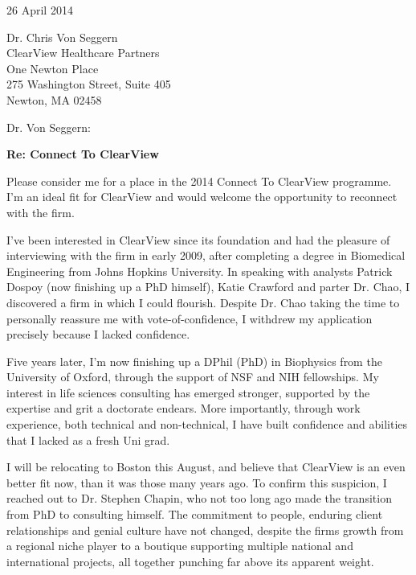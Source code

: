 \documentclass{../res}
\begin{document}
 
\begin{sloppypar}
 
%


\begin{resume} 
 
26 April 2014

Dr. Chris Von Seggern \\
ClearView Healthcare Partners \\
One Newton Place \\
275 Washington Street, Suite 405 \\
Newton, MA 02458

Dr. Von Seggern:

\textbf{Re: Connect To ClearView}

Please consider me for a place in the 2014 Connect To ClearView programme. I'm an ideal fit for ClearView and would welcome the opportunity to reconnect with the firm.

I've been interested in ClearView since its foundation and had the pleasure of interviewing with the firm in early 2009, after completing a degree in Biomedical Engineering from Johns Hopkins University. In speaking with analysts Patrick Dospoy (now finishing up a PhD himself), Katie Crawford and parter Dr. Chao, I discovered a firm in which I could flourish. Despite Dr. Chao taking the time to personally reassure me with vote-of-confidence, I withdrew my application precisely because I lacked confidence.

Five years later, I'm now finishing up a DPhil (PhD) in Biophysics from the University of Oxford, through the support of NSF and NIH fellowships. My interest in life sciences consulting has emerged stronger, supported by the expertise and grit a doctorate endears. More importantly, through work experience, both technical and non-technical, I have built confidence and abilities that I lacked as a fresh Uni grad. 

I will be relocating to Boston this August, and believe that ClearView is an even better fit now, than it was those many years ago. To confirm this suspicion, I reached out to Dr. Stephen Chapin, who not too long ago made the transition from PhD to consulting himself. The commitment to people, enduring client relationships and genial culture have not changed, despite the firms growth from a regional niche player to a boutique supporting multiple national and international projects, all together punching far above its apparent weight. 


\end{resume}
\end{sloppypar}
\end{document}
